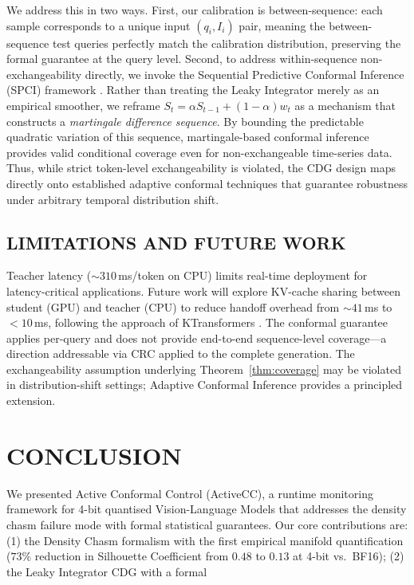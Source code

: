 \documentclass{ieeetmlcn}
\begin{document}
We address this in two ways. First, our calibration is between-sequence: each sample corresponds to a unique input $(q_i, I_i)$ pair, meaning the between-sequence test queries perfectly match the calibration distribution, preserving the formal guarantee at the query level. Second, to address within-sequence non-exchangeability directly, we invoke the Sequential Predictive Conformal Inference (SPCI) framework \cite{pmlr-v202-xu23r}. Rather than treating the Leaky Integrator merely as an empirical smoother, we reframe $S_t = \alpha S_{t-1} + (1-\alpha) w_t$ as a mechanism that constructs a \emph{martingale difference sequence}. By bounding the predictable quadratic variation of this sequence, martingale-based conformal inference provides valid conditional coverage even for non-exchangeable time-series data. Thus, while strict token-level exchangeability is violated, the CDG design maps directly onto established adaptive conformal techniques \cite{gibbs2021adaptive} that guarantee robustness under arbitrary temporal distribution shift.

\subsection{LIMITATIONS AND FUTURE WORK}
Teacher latency ($\sim\!310$\,ms/token on CPU) limits real-time
deployment for latency-critical applications. Future work will explore
KV-cache sharing between student (GPU) and teacher (CPU) to reduce
handoff overhead from $\sim\!41$\,ms to $<10$\,ms, following the
approach of KTransformers \cite{chen2025ktransformers}. The conformal
guarantee applies per-query and does not provide end-to-end
sequence-level coverage---a direction addressable via CRC \cite{angelopoulos2024conformal}
applied to the complete generation. The exchangeability assumption
underlying Theorem~\ref{thm:coverage} may be violated in
distribution-shift settings; Adaptive Conformal Inference
\cite{gibbs2021adaptive} provides a principled extension.

\section{CONCLUSION}
We presented Active Conformal Control (ActiveCC), a runtime monitoring
framework for 4-bit quantised Vision-Language Models that addresses the
density chasm failure mode with formal statistical guarantees. Our core
contributions are: (1) the Density Chasm formalism with the first empirical manifold quantification ($73\%$ reduction in Silhouette Coefficient from $0.48$ to $0.13$ at 4-bit vs.\ BF16); (2) the Leaky Integrator CDG with a formal
\end{document}
